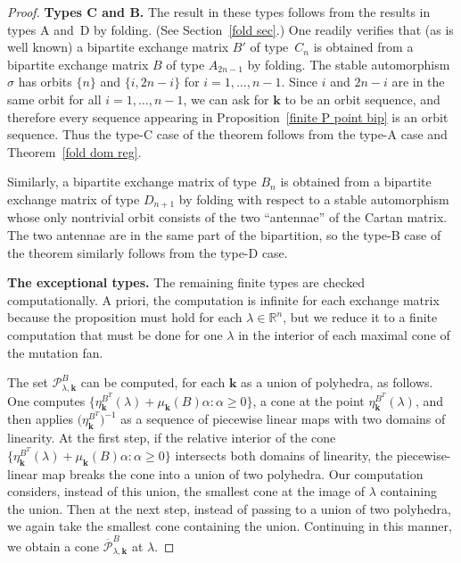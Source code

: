 \documentclass{amsart}
\theoremstyle{definition}
\theoremstyle{remark}
\numberwithin{equation}{section}
\newcommand{\reals}{\mathbb R}
\newcommand{\set}[1]{{\lbrace #1 \rbrace}}
\newcommand{\sett}[1]{{\bigl\lbrace #1 \bigr\rbrace}}
\newcommand{\0}{{\mathbf{0}}}
\newcommand{\kk}{{\boldsymbol{k}}}
\renewcommand{\P}{\mathcal{P}}
\begin{document}
\begin{proof}
\medskip

\noindent
\textbf{Types C and B.} 
The result in these types follows from the results in types A and~D by folding.
(See Section~\ref{fold sec}.)
One readily verifies that (as is well known) a bipartite exchange matrix $B'$ of type~$C_n$ is obtained from a bipartite exchange matrix $B$ of type $A_{2n-1}$ by folding.
The stable automorphism $\sigma$ has orbits $\set{n}$ and $\set{i,2n-i}$ for $i=1,\ldots,n-1$.
Since $i$ and $2n-i$ are in the same orbit for all $i=1,\ldots,n-1$, we can ask for $\kk$ to be an orbit sequence, and therefore every sequence appearing in Proposition~\ref{finite P point bip} is an orbit sequence.
Thus the type-C case of the theorem follows from the type-A case and Theorem~\ref{fold dom reg}.

Similarly, a bipartite exchange matrix of type $B_n$ is obtained from a bipartite exchange matrix of type $D_{n+1}$ by folding with respect to a stable automorphism whose only nontrivial orbit consists of the two ``antennae'' of the Cartan matrix.
The two antennae are in the same part of the bipartition, so the type-B case of the theorem similarly follows from the type-D case.

\medskip

\noindent
\textbf{The exceptional types.}
The remaining finite types are checked computationally.
A priori, the computation is infinite for each exchange matrix because the proposition must hold for each $\lambda\in\reals^n$, but we reduce it to a finite computation that must be done for one $\lambda$ in the interior of each maximal cone of the mutation fan.

The set $\P^B_{\lambda,\kk}$ can be computed, for each $\kk$ as a union of polyhedra, as follows.
One computes $\sett{\eta_\kk^{B^T}(\lambda)+\mu_\kk(B)\alpha:\alpha\ge0}$, a cone at the point $\eta_\kk^{B^T}(\lambda)$, and then applies $\bigl(\eta_{\kk}^{B^T}\bigr)^{-1}$ as a sequence of piecewise linear maps with two domains of linearity.
At the first step, if the relative interior of the cone $\sett{\eta_\kk^{B^T}(\lambda)+\mu_\kk(B)\alpha:\alpha\ge0}$ intersects both domains of linearity, the piecewise-linear map breaks the cone into a union of two polyhedra.
Our computation considers, instead of this union, the smallest cone at the image of $\lambda$ containing the union.
Then at the next step, instead of passing to a union of two polyhedra, we again take the smallest cone containing the union.  
Continuing in this manner, we obtain a cone $\overline{\P}^B_{\lambda,\kk}$ at $\lambda$.


\end{proof}
\end{document}
